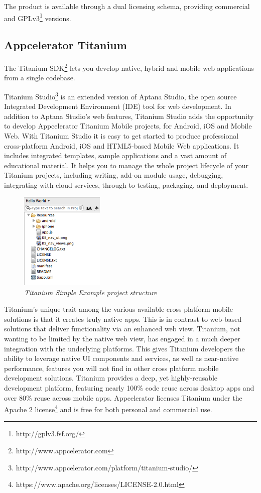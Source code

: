 \documentclass[a4paper,12pt]{book}
\begin{document}
The product is available through a dual licensing schema, providing commercial and GPLv3\footnote{http://gplv3.fsf.org/} versions. 

\subsection{Appcelerator Titanium}
\label{Appcelerator Titanium} 

The Titanium SDK\footnote{http://www.appcelerator.com} lets you develop native, hybrid and mobile web applications from a single codebase. 

Titanium Studio\footnote{http://www.appcelerator.com/platform/titanium-studio/} is an extended version of Aptana Studio, the open source Integrated Development Environment (IDE) tool for web development. In addition to Aptana Studio's web features, Titanium Studio adds the opportunity to develop Appcelerator Titanium Mobile projects, for Android, iOS and Mobile Web. With Titanium Studio it is easy to get started to produce professional cross-platform Android, iOS and HTML5-based Mobile Web applications. It includes integrated templates, sample applications and a vast amount of educational material. It helps you to manage the whole project lifecycle of your Titanium projects, including writing, add-on module usage, debugging, integrating with cloud services, through to testing, packaging, and deployment.

\begin{figure}[H]
    \centering
    \includegraphics[width=4cm, keepaspectratio]{img/titanium.png}
    \caption{\textit{Titanium Simple Example project structure}}
 \end{figure}

Titanium's unique trait among the various available cross platform mobile solutions is that it creates truly native apps. This is in contrast to web-based solutions that deliver functionality via an enhanced web view. Titanium, not wanting to be limited by the native web view, has engaged in a much deeper integration with the underlying platforms. This gives Titanium developers the ability to leverage native UI components and services, as well as near-native performance, features you will not find in other cross platform mobile development solutions. Titanium provides a deep, yet highly-reusable development platform, featuring nearly 100\% code reuse across desktop apps and over 80\% reuse across mobile apps. Appcelerator licenses Titanium under the Apache 2 license\footnote{https://www.apache.org/licenses/LICENSE-2.0.html}  and is free for both personal and commercial use.
\end{document}
